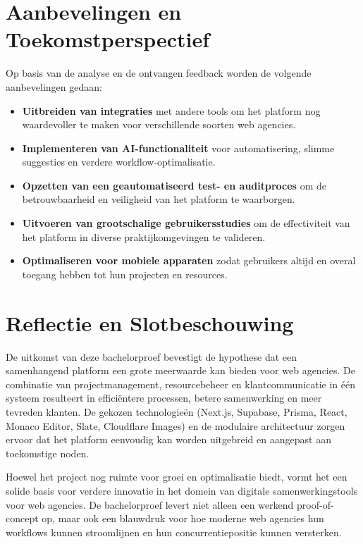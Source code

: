 \section{Aanbevelingen en Toekomstperspectief}

Op basis van de analyse en de ontvangen feedback worden de volgende aanbevelingen gedaan:
\begin{itemize}
    \item \textbf{Uitbreiden van integraties} met andere tools om het platform nog waardevoller te maken voor verschillende soorten web agencies.
    \item \textbf{Implementeren van AI-functionaliteit} voor automatisering, slimme suggesties en verdere workflow-optimalisatie.
    \item \textbf{Opzetten van een geautomatiseerd test- en auditproces} om de betrouwbaarheid en veiligheid van het platform te waarborgen.
    \item \textbf{Uitvoeren van grootschalige gebruikersstudies} om de effectiviteit van het platform in diverse praktijkomgevingen te valideren.
    \item \textbf{Optimaliseren voor mobiele apparaten} zodat gebruikers altijd en overal toegang hebben tot hun projecten en resources.
\end{itemize}

\section{Reflectie en Slotbeschouwing}

De uitkomst van deze bachelorproef bevestigt de hypothese dat een samenhangend platform een grote meerwaarde kan bieden voor web agencies. De combinatie van projectmanagement, resourcebeheer en klantcommunicatie in één systeem resulteert in efficiëntere processen, betere samenwerking en meer tevreden klanten. De gekozen technologieën (Next.js, Supabase, Prisma, React, Monaco Editor, Slate, Cloudflare Images) en de modulaire architectuur zorgen ervoor dat het platform eenvoudig kan worden uitgebreid en aangepast aan toekomstige noden.

Hoewel het project nog ruimte voor groei en optimalisatie biedt, vormt het een solide basis voor verdere innovatie in het domein van digitale samenwerkingstools voor web agencies. De bachelorproef levert niet alleen een werkend proof-of-concept op, maar ook een blauwdruk voor hoe moderne web agencies hun workflows kunnen stroomlijnen en hun concurrentiepositie kunnen versterken.


